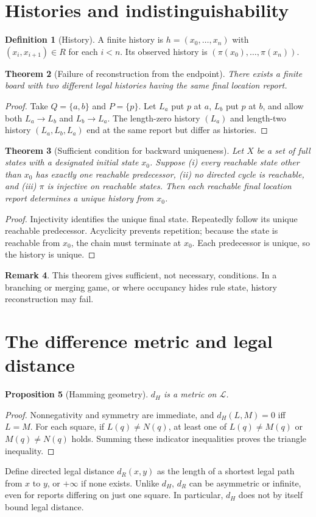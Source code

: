 \documentclass[11pt]{article}
\newtheorem{theorem}{Theorem}[section]
\newtheorem{proposition}[theorem]{Proposition}
\theoremstyle{definition}
\newtheorem{definition}[theorem]{Definition}
\newtheorem{remark}[theorem]{Remark}
\begin{document}
\section{Histories and indistinguishability}
\begin{definition}[History]
A finite history is $h=(x_0,\ldots,x_n)$ with $(x_i,x_{i+1})\in R$ for each $i<n$. Its observed history is $(\pi(x_0),\ldots,\pi(x_n))$.
\end{definition}
\begin{theorem}[Failure of reconstruction from the endpoint]
There exists a finite board with two different legal histories having the same final location report.
\end{theorem}
\begin{proof}
Take $Q=\{a,b\}$ and $P=\{p\}$. Let $L_a$ put $p$ at $a$, $L_b$ put $p$ at $b$, and allow both $L_a\to L_b$ and $L_b\to L_a$. The length-zero history $(L_a)$ and length-two history $(L_a,L_b,L_a)$ end at the same report but differ as histories.
\end{proof}
\begin{theorem}[Sufficient condition for backward uniqueness]
Let $X$ be a set of full states with a designated initial state $x_0$. Suppose (i) every reachable state other than $x_0$ has exactly one reachable predecessor, (ii) no directed cycle is reachable, and (iii) $\pi$ is injective on reachable states. Then each reachable final location report determines a unique history from $x_0$.
\end{theorem}
\begin{proof}
Injectivity identifies the unique final state. Repeatedly follow its unique reachable predecessor. Acyclicity prevents repetition; because the state is reachable from $x_0$, the chain must terminate at $x_0$. Each predecessor is unique, so the history is unique.
\end{proof}
\begin{remark}
This theorem gives sufficient, not necessary, conditions. In a branching or merging game, or where occupancy hides rule state, history reconstruction may fail.
\end{remark}
\section{The difference metric and legal distance}
\begin{proposition}[Hamming geometry]
$d_H$ is a metric on $\mathcal L$.
\end{proposition}
\begin{proof}
Nonnegativity and symmetry are immediate, and $d_H(L,M)=0$ iff $L=M$. For each square, if $L(q)\ne N(q)$, at least one of $L(q)\ne M(q)$ or $M(q)\ne N(q)$ holds. Summing these indicator inequalities proves the triangle inequality.
\end{proof}
Define directed legal distance $d_R(x,y)$ as the length of a shortest legal path from $x$ to $y$, or $+\infty$ if none exists. Unlike $d_H$, $d_R$ can be asymmetric or infinite, even for reports differing on just one square. In particular, $d_H$ does not by itself bound legal distance.
\end{document}
